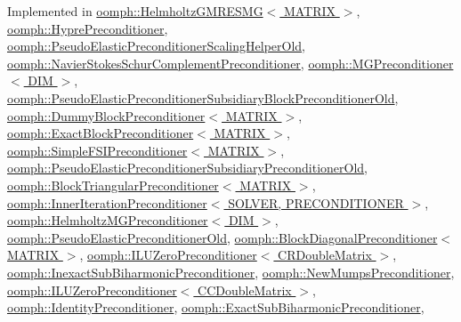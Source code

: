Implemented in \hyperlink{classoomph_1_1HelmholtzGMRESMG_a6050720b0d12f422e4b2983378dc53e5}{oomph\+::\+Helmholtz\+G\+M\+R\+E\+S\+M\+G$<$ M\+A\+T\+R\+I\+X $>$}, \hyperlink{classoomph_1_1HyprePreconditioner_ad4967b01386d24d1839bccb99b2f9560}{oomph\+::\+Hypre\+Preconditioner}, \hyperlink{classoomph_1_1PseudoElasticPreconditionerScalingHelperOld_a185bc08ce33f220d9ef61745b46e0633}{oomph\+::\+Pseudo\+Elastic\+Preconditioner\+Scaling\+Helper\+Old}, \hyperlink{classoomph_1_1NavierStokesSchurComplementPreconditioner_adbc87003dd8e8c924ae802651b18f2ed}{oomph\+::\+Navier\+Stokes\+Schur\+Complement\+Preconditioner}, \hyperlink{classoomph_1_1MGPreconditioner_afa4c545cc49e9712e4d68f5c0275aefe}{oomph\+::\+M\+G\+Preconditioner$<$ D\+I\+M $>$}, \hyperlink{classoomph_1_1PseudoElasticPreconditionerSubsidiaryBlockPreconditionerOld_a31f3b927696c11c90f704178cae13e7e}{oomph\+::\+Pseudo\+Elastic\+Preconditioner\+Subsidiary\+Block\+Preconditioner\+Old}, \hyperlink{classoomph_1_1DummyBlockPreconditioner_a362eae22ec757442bf17aa2de9bc82da}{oomph\+::\+Dummy\+Block\+Preconditioner$<$ M\+A\+T\+R\+I\+X $>$}, \hyperlink{classoomph_1_1ExactBlockPreconditioner_a4267f2937d09e9949b355a19ad107044}{oomph\+::\+Exact\+Block\+Preconditioner$<$ M\+A\+T\+R\+I\+X $>$}, \hyperlink{classoomph_1_1SimpleFSIPreconditioner_a31684c26aa10a782189c32304d9d0824}{oomph\+::\+Simple\+F\+S\+I\+Preconditioner$<$ M\+A\+T\+R\+I\+X $>$}, \hyperlink{classoomph_1_1PseudoElasticPreconditionerSubsidiaryPreconditionerOld_a01d70c9e3454b52c86f4439d29fd4b22}{oomph\+::\+Pseudo\+Elastic\+Preconditioner\+Subsidiary\+Preconditioner\+Old}, \hyperlink{classoomph_1_1BlockTriangularPreconditioner_aede879082caa04a2de50c811ee6d7f5b}{oomph\+::\+Block\+Triangular\+Preconditioner$<$ M\+A\+T\+R\+I\+X $>$}, \hyperlink{classoomph_1_1InnerIterationPreconditioner_a6d30ced26206cb866f9ae51cc4caebae}{oomph\+::\+Inner\+Iteration\+Preconditioner$<$ S\+O\+L\+V\+E\+R, P\+R\+E\+C\+O\+N\+D\+I\+T\+I\+O\+N\+E\+R $>$}, \hyperlink{classoomph_1_1HelmholtzMGPreconditioner_a20e891e7a2d84f81fc56a003d7f2925f}{oomph\+::\+Helmholtz\+M\+G\+Preconditioner$<$ D\+I\+M $>$}, \hyperlink{classoomph_1_1PseudoElasticPreconditionerOld_a20b548d07e0f4116f59444ccb69d980f}{oomph\+::\+Pseudo\+Elastic\+Preconditioner\+Old}, \hyperlink{classoomph_1_1BlockDiagonalPreconditioner_a129f0d7877ced9efaa3a7f018618f44b}{oomph\+::\+Block\+Diagonal\+Preconditioner$<$ M\+A\+T\+R\+I\+X $>$}, \hyperlink{classoomph_1_1ILUZeroPreconditioner_3_01CRDoubleMatrix_01_4_ae0bff88ef761683c868110347c6d81db}{oomph\+::\+I\+L\+U\+Zero\+Preconditioner$<$ C\+R\+Double\+Matrix $>$}, \hyperlink{classoomph_1_1InexactSubBiharmonicPreconditioner_af15b753e7631a5f6de0bb33cebf37fad}{oomph\+::\+Inexact\+Sub\+Biharmonic\+Preconditioner}, \hyperlink{classoomph_1_1NewMumpsPreconditioner_a763a8297c031fab7f16b37eaf257aeb1}{oomph\+::\+New\+Mumps\+Preconditioner}, \hyperlink{classoomph_1_1ILUZeroPreconditioner_3_01CCDoubleMatrix_01_4_adadad5eca4d828d3d8a07547d83bd9a6}{oomph\+::\+I\+L\+U\+Zero\+Preconditioner$<$ C\+C\+Double\+Matrix $>$}, \hyperlink{classoomph_1_1IdentityPreconditioner_a8daf11465066158a258b5996984490af}{oomph\+::\+Identity\+Preconditioner}, \hyperlink{classoomph_1_1ExactSubBiharmonicPreconditioner_aaf4493aaa8dcd46cf585b7585d246ad0}{oomph\+::\+Exact\+Sub\+Biharmonic\+Preconditioner}, 